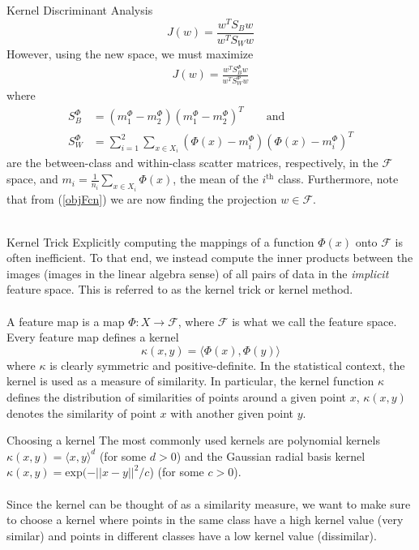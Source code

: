 \begin{section}{Kernel Discriminant Analysis}
$$
	J(w) = \frac{w^T S_B w}{w^T S_W w}
$$
However, using the new space, we must maximize
\begin{align}
	J(w) = \frac{w^T S_B^\Phi w}{w^T S_W^\Phi w} \label{objFcn}
\end{align}
where 
\begin{align*}
	S_B^\Phi &= (m_1^\Phi - m_2^\Phi) (m_1^\Phi - m_2^\Phi)^T \qquad \text{and} \\
	S_W^\Phi &= \sum_{i=1}^2 \sum_{x \in X_i} (\Phi(x) - m_i^\Phi) (\Phi(x) - m_i^\Phi)^T
\end{align*}
are the between-class and within-class scatter matrices, respectively, in the $\mathcal{F}$ space, and $m_i = \frac{1}{n_i} \sum_{x \in X_i} \Phi( x )$, the mean of the $i^{\text{th}}$ class. Furthermore, note that from (\ref{objFcn}) we are now finding the projection $w \in \mathcal{F}$.
\\
\\

\begin{subsection}{Kernel Trick}
Explicitly computing the mappings of a function $\Phi(x)$ onto $\mathcal{F}$ is often inefficient. To that end, we instead compute the inner products between the images (images in the linear algebra sense) of all pairs of data in the \textit{implicit} feature space. This is referred to as the kernel trick or kernel method.
\\
\\
A feature map is a map $\Phi:X \to \mathcal{F}$, where $\mathcal{F}$ is what we call the feature space. Every feature map defines a kernel
$$
	\kappa(x,y) = \langle \Phi(x), \Phi(y) \rangle
$$
where $\kappa$ is clearly symmetric and positive-definite. In the statistical context, the kernel is used as a measure of similarity. In particular, the kernel function $\kappa$ defines the distribution of similarities of points around a given point $x$, $\kappa(x,y)$ denotes the similarity of point $x$ with another given point $y$. 
\end{subsection}

\begin{subsection}{Choosing a kernel}
The most commonly used kernels are polynomial kernels $\kappa(x,y) = \langle x, y \rangle ^d$ (for some $d>0$) and the Gaussian radial basis kernel $\kappa(x,y) = \text{exp}(- ||x-y||^2 / c$) (for some $c > 0$).
\\
\\
Since the kernel can be thought of as a similarity measure, we want to make sure to choose a kernel where points in the same class have a high kernel value (very similar) and points in different classes have a low kernel value (dissimilar).
\end{subsection}


\end{section}
